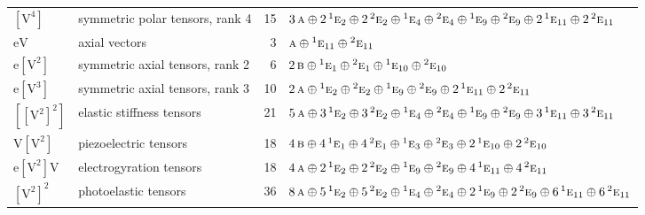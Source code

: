 \documentclass[10pt,a4paper]{article}
\numberwithin{equation}{section}
\newcommand{\irr}[1]{\text{\normalfont\scshape #1}}
\newcommand{\conjpair}[1]{{}^{#1}}
\newcommand{\jahn}[1]{\mathrm{#1}}
\newlength{\fillwidth}\newlength{\cellwidth}\newlength{\colwidth}
\begin{document}
{\begin{longtable}{@{}llr>{\RaggedRight\arraybackslash}p{\fillwidth}@{}}
$\jahn{[V^{4}]}$ & symmetric polar tensors, rank 4 & 15 & $3\,\irr{a} \oplus\allowbreak 2\,\conjpair{1}\irr{e}_{2} \oplus\allowbreak 2\,\conjpair{2}\irr{e}_{2} \oplus\allowbreak \conjpair{1}\irr{e}_{4} \oplus\allowbreak \conjpair{2}\irr{e}_{4} \oplus\allowbreak \conjpair{1}\irr{e}_{9} \oplus\allowbreak \conjpair{2}\irr{e}_{9} \oplus\allowbreak 2\,\conjpair{1}\irr{e}_{11} \oplus\allowbreak 2\,\conjpair{2}\irr{e}_{11}$\\
$\jahn{eV}$ & axial vectors & 3 & $\irr{a} \oplus\allowbreak \conjpair{1}\irr{e}_{11} \oplus\allowbreak \conjpair{2}\irr{e}_{11}$\\
$\jahn{e[V^{2}]}$ & symmetric axial tensors, rank 2 & 6 & $2\,\irr{b} \oplus\allowbreak \conjpair{1}\irr{e}_{1} \oplus\allowbreak \conjpair{2}\irr{e}_{1} \oplus\allowbreak \conjpair{1}\irr{e}_{10} \oplus\allowbreak \conjpair{2}\irr{e}_{10}$\\
$\jahn{e[V^{3}]}$ & symmetric axial tensors, rank 3 & 10 & $2\,\irr{a} \oplus\allowbreak \conjpair{1}\irr{e}_{2} \oplus\allowbreak \conjpair{2}\irr{e}_{2} \oplus\allowbreak \conjpair{1}\irr{e}_{9} \oplus\allowbreak \conjpair{2}\irr{e}_{9} \oplus\allowbreak 2\,\conjpair{1}\irr{e}_{11} \oplus\allowbreak 2\,\conjpair{2}\irr{e}_{11}$\\
$\jahn{[[V^{2}]^{2}]}$ & elastic stiffness tensors & 21 & $5\,\irr{a} \oplus\allowbreak 3\,\conjpair{1}\irr{e}_{2} \oplus\allowbreak 3\,\conjpair{2}\irr{e}_{2} \oplus\allowbreak \conjpair{1}\irr{e}_{4} \oplus\allowbreak \conjpair{2}\irr{e}_{4} \oplus\allowbreak \conjpair{1}\irr{e}_{9} \oplus\allowbreak \conjpair{2}\irr{e}_{9} \oplus\allowbreak 3\,\conjpair{1}\irr{e}_{11} \oplus\allowbreak 3\,\conjpair{2}\irr{e}_{11}$\\
$\jahn{V[V^{2}]}$ & piezoelectric tensors & 18 & $4\,\irr{b} \oplus\allowbreak 4\,\conjpair{1}\irr{e}_{1} \oplus\allowbreak 4\,\conjpair{2}\irr{e}_{1} \oplus\allowbreak \conjpair{1}\irr{e}_{3} \oplus\allowbreak \conjpair{2}\irr{e}_{3} \oplus\allowbreak 2\,\conjpair{1}\irr{e}_{10} \oplus\allowbreak 2\,\conjpair{2}\irr{e}_{10}$\\
$\jahn{e[V^{2}]V}$ & electrogyration tensors & 18 & $4\,\irr{a} \oplus\allowbreak 2\,\conjpair{1}\irr{e}_{2} \oplus\allowbreak 2\,\conjpair{2}\irr{e}_{2} \oplus\allowbreak \conjpair{1}\irr{e}_{9} \oplus\allowbreak \conjpair{2}\irr{e}_{9} \oplus\allowbreak 4\,\conjpair{1}\irr{e}_{11} \oplus\allowbreak 4\,\conjpair{2}\irr{e}_{11}$\\
$\jahn{[V^{2}]^{2}}$ & photoelastic tensors & 36 & $8\,\irr{a} \oplus\allowbreak 5\,\conjpair{1}\irr{e}_{2} \oplus\allowbreak 5\,\conjpair{2}\irr{e}_{2} \oplus\allowbreak \conjpair{1}\irr{e}_{4} \oplus\allowbreak \conjpair{2}\irr{e}_{4} \oplus\allowbreak 2\,\conjpair{1}\irr{e}_{9} \oplus\allowbreak 2\,\conjpair{2}\irr{e}_{9} \oplus\allowbreak 6\,\conjpair{1}\irr{e}_{11} \oplus\allowbreak 6\,\conjpair{2}\irr{e}_{11}$\\

\end{longtable}}
\end{document}
